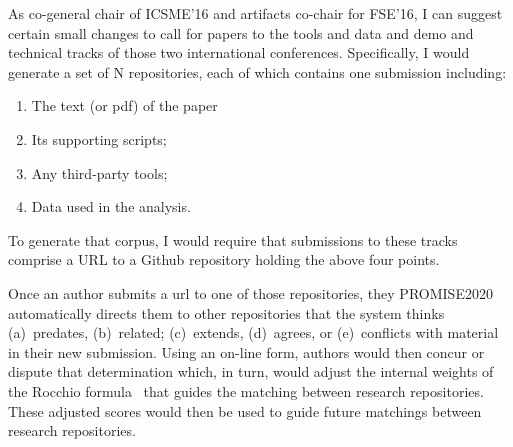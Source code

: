 \documentclass[journal]{IEEEtran}
\newcommand{\be}{\begin{enumerate}}
\newcommand{\ee}{\end{enumerate}}
\begin{document}
As  co-general chair of ICSME'16 and artifacts co-chair for FSE'16, I can suggest certain small changes to call for papers to the tools and data and demo and technical tracks of those two international conferences. Specifically, I would generate a set of  N repositories, each of which contains one submission including:
\be
\item The text (or pdf) of the  paper  
\item Its supporting scripts;
\item Any third-party tools; 
\item Data used in the analysis.
\ee
To generate that corpus, 
I would require that submissions to these tracks comprise a URL to a Github repository holding the above four points. 

Once an author submits a url to one of those repositories, they PROMISE2020   automatically directs them  to other repositories that the system thinks   (a)~predates, (b)~related; (c)~extends, (d)~agrees, or (e)~conflicts with material in their  new submission.
Using an on-line form,
authors would then concur or dispute that determination which, in turn, would adjust the internal weights of the Rocchio formula~\cite{rocc71} that guides the matching between research repositories. These adjusted scores would then be used to guide future matchings between research repositories.
\end{document}
